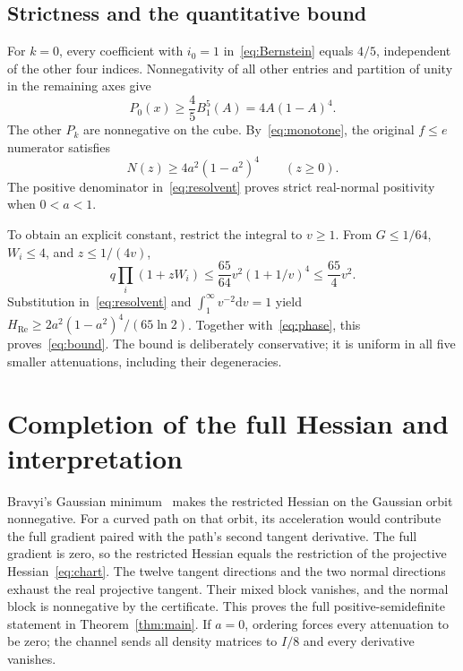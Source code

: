 \documentclass[11pt,a4paper]{article}
\newcommand{\dd}{\mathrm{d}}
\newcommand{\Ree}{\operatorname{Re}}
\begin{document}
\subsection{Strictness and the quantitative bound}
For $k=0$, every coefficient with $i_0=1$ in~\eqref{eq:Bernstein}
equals $4/5$, independent of the other four indices. Nonnegativity
of all other entries and partition of unity in the remaining axes give
\begin{equation}
 P_0(x)\ge\frac45 B_1^5(A)=4A(1-A)^4.
 \label{eq:slice}
\end{equation}
The other $P_k$ are nonnegative on the cube. By~\eqref{eq:monotone},
the original $f\le e$ numerator satisfies
\begin{equation}
 N(z)\ge4a^2(1-a^2)^4\qquad (z\ge0).
\end{equation}
The positive denominator in~\eqref{eq:resolvent} proves strict
real-normal positivity when $0<a<1$.

To obtain an explicit constant, restrict the integral to $v\ge1$.
From $G\le1/64$, $W_i\le4$, and $z\le1/(4v)$,
\begin{equation}
 q\prod_i(1+zW_i)
 \le\frac{65}{64}v^2(1+1/v)^4
 \le\frac{65}{4}v^2.
\end{equation}
Substitution in~\eqref{eq:resolvent} and
$\int_1^\infty v^{-2}\dd v=1$ yield
$H_{\Ree}\ge2a^2(1-a^2)^4/(65\ln2)$.
Together with~\eqref{eq:phase}, this proves~\eqref{eq:bound}.
The bound is deliberately conservative; it is uniform in all five
smaller attenuations, including their degeneracies.

\section{Completion of the full Hessian and interpretation}
Bravyi's Gaussian minimum~\cite[Theorem~1 and Eq.~(34)]{Bravyi2005}
makes the restricted Hessian on the Gaussian orbit nonnegative.
For a curved path on that orbit, its acceleration would contribute
the full gradient paired with the path's second tangent derivative.
The full gradient is zero, so the restricted Hessian equals the
restriction of the projective Hessian~\eqref{eq:chart}.
The twelve tangent directions and the two normal directions exhaust
the real projective tangent. Their mixed block vanishes, and the
normal block is nonnegative by the certificate. This proves the
full positive-semidefinite statement in Theorem~\ref{thm:main}.
If $a=0$, ordering forces every attenuation to be zero; the channel
sends all density matrices to $I/8$ and every derivative vanishes.
\end{document}
